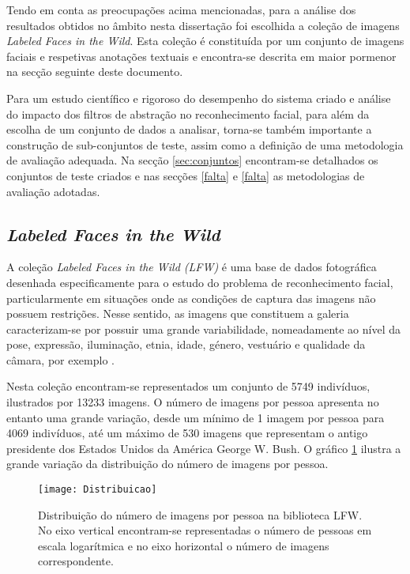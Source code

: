Tendo em conta as preocupações acima mencionadas, para a análise dos resultados obtidos no âmbito nesta dissertação foi escolhida a coleção de imagens \textit{Labeled Faces in the Wild}. Esta coleção é constituída por um conjunto de imagens faciais e respetivas anotações textuais e encontra-se descrita em maior pormenor na secção seguinte deste documento.

Para um estudo científico e rigoroso do desempenho do sistema criado e análise do impacto dos filtros de abstração no reconhecimento facial, para além da escolha de um conjunto de dados a analisar, torna-se também importante a construção de sub-conjuntos de teste, assim como a definição de uma metodologia de avaliação adequada. Na secção \ref{sec:conjuntos} encontram-se detalhados os conjuntos de teste criados e nas secções \ref{falta} e \ref{falta} as metodologias de avaliação adotadas.

\subsection{\textit{Labeled Faces in the Wild}}  \label{sec:lfw}
A coleção \textit{Labeled Faces in the Wild (LFW)} é uma base de dados fotográfica desenhada especificamente para o estudo do problema de reconhecimento facial, particularmente em situações onde as condições de captura das imagens não possuem restrições. Nesse sentido, as imagens que constituem a galeria caracterizam-se por possuir uma grande variabilidade, nomeadamente ao nível da pose, expressão, iluminação, etnia, idade, género, vestuário e qualidade da câmara, por exemplo \cite{Huang2007}.

Nesta coleção encontram-se representados um conjunto de 5749 indivíduos, ilustrados por 13233 imagens. O número de imagens por pessoa apresenta no entanto uma grande variação, desde um mínimo de 1 imagem por pessoa para 4069 indivíduos, até um máximo de 530 imagens que representam o antigo presidente dos Estados Unidos da América George W. Bush. O gráfico \ref{fig:distribuicaoLFW} ilustra a grande variação da distribuição do número de imagens por pessoa.

\begin{figure}[ht]
  \begin{center}
    \leavevmode
    \texttt{[image: Distribuicao]}
    \caption{Distribuição do número de imagens por pessoa na biblioteca LFW. No eixo vertical encontram-se representadas o número de pessoas em escala logarítmica e no eixo horizontal o número de imagens correspondente.}
    \label{fig:distribuicaoLFW}
  \end{center}
\end{figure}

